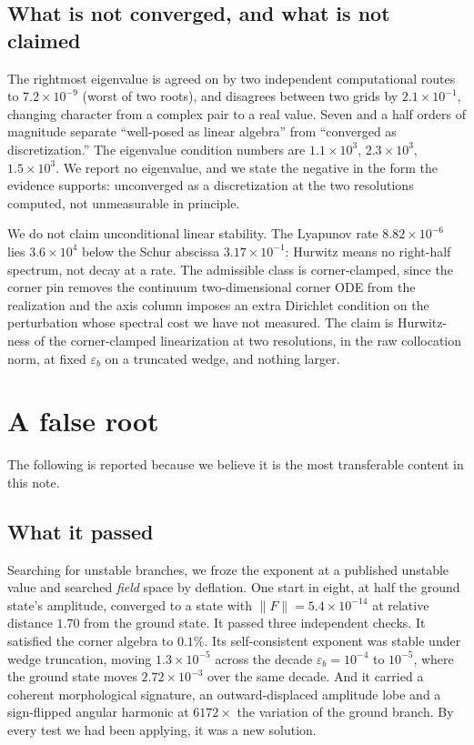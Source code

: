 \documentclass[11pt]{article}
\begin{document}
\subsection{What is not converged, and what is not claimed}
\label{sec:notmeas}

The rightmost eigenvalue is agreed on by two independent computational routes to
$7.2\times10^{-9}$ (worst of two roots), and disagrees between two grids by
$2.1\times10^{-1}$, changing character from a complex pair to a real value. Seven and a
half orders of magnitude separate ``well-posed as linear algebra'' from ``converged as
discretization.'' The eigenvalue condition numbers are $1.1\times10^{3}$,
$2.3\times10^{3}$, $1.5\times10^{3}$. We report no eigenvalue, and we state the negative
in the form the evidence supports: unconverged as a discretization at the two resolutions
computed, not unmeasurable in principle.

We do not claim unconditional linear stability. The Lyapunov rate $8.82\times10^{-6}$
lies $3.6\times10^{4}$ below the Schur abscissa $3.17\times10^{-1}$: Hurwitz means no
right-half spectrum, not decay at a rate. The admissible class is corner-clamped, since
the corner pin removes the continuum two-dimensional corner ODE from the realization and
the axis column imposes an extra Dirichlet condition on the perturbation whose spectral
cost we have not measured. The claim is Hurwitz-ness of the corner-clamped linearization
at two resolutions, in the raw collocation norm, at fixed $\varepsilon_b$ on a truncated
wedge, and nothing larger.

\section{A false root}
\label{sec:false}

The following is reported because we believe it is the most transferable content in this
note.

\subsection{What it passed}

Searching for unstable branches, we froze the exponent at a published unstable value and
searched \emph{field} space by deflation. One start in eight, at half the ground state's
amplitude, converged to a state with $\|F\| = 5.4\times10^{-14}$ at relative distance
$1.70$ from the ground state. It passed three independent checks. It satisfied the corner
algebra to $0.1\%$. Its self-consistent exponent was stable under wedge truncation,
moving $1.3\times10^{-5}$ across the decade $\varepsilon_b = 10^{-4}$ to $10^{-5}$, where
the ground state moves $2.72\times10^{-3}$ over the same decade. And it carried a
coherent morphological signature, an outward-displaced amplitude lobe and a sign-flipped
angular harmonic at $6172\times$ the variation of the ground branch. By every test we had
been applying, it was a new solution.
\end{document}
